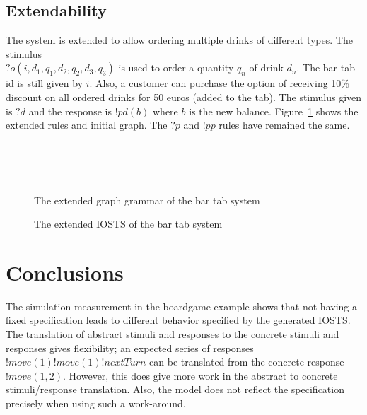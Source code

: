 \subsection{Extendability}
The system is extended to allow ordering multiple drinks of different types. The stimulus \\$?o(i,d_1,q_1,d_2,q_2,d_3,q_3)$ is used to order a quantity $q_n$ of drink $d_n$. The bar tab id is still given by $i$. Also, a customer can purchase the option of receiving 10\% discount on all ordered drinks for 50 euros (added to the tab). The stimulus given is $?\mathit{d}$ and the response is $!pd(b)$ where $b$ is the new balance. Figure~\ref{fig:gg-bartab-extended} shows the extended rules and initial graph. The $?p$ and $!pp$ rules have remained the same.

\begin{figure}[ht]
  \begin{center}
    \hspace{20px}
    \\
    \hspace{20px}
    \\
    \\
  \end{center}
  \caption{The extended graph grammar of the bar tab system}
  \label{fig:gg-bartab-extended}
\end{figure}

\begin{figure}[ht]
  \begin{center}
    
  \end{center}
  \caption{The extended IOSTS of the bar tab system}
  \label{fig:sts-bartab-extended}
\end{figure}


\section{Conclusions}
The simulation measurement in the boardgame example shows that not having a fixed specification leads to different behavior specified by the generated IOSTS. The translation of abstract stimuli and responses to the concrete stimuli and responses gives flexibility; an expected series of responses $!move(1) !move(1) !nextTurn$ can be translated from the concrete response $!move(1,2)$. However, this does give more work in the abstract to concrete stimuli/response translation. Also, the model does not reflect the specification precisely when using such a work-around.

